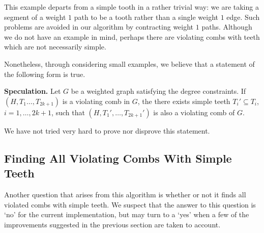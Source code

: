 \documentclass[11pt, letterpaper]{amsart}
\theoremstyle{plain}
\theoremstyle{definition}
\theoremstyle{remark}
\begin{document}
This example departs from a simple tooth in a rather trivial way: we are taking
a segment of a weight $1$ path to be a tooth rather than a single weight $1$
edge. Such problems are avoided in our algorithm by contracting weight $1$
paths. Although we do not have an example in mind, perhaps there are violating
combs with teeth which are not necessarily simple.

Nonetheless, through considering small examples, we believe that a statement of
the following form is true.

\noindent\textbf{Speculation.} Let $G$ be a weighted graph satisfying
the degree constraints. If $(H,T_1\ldots,T_{2k+1})$ is a violating comb in $G$,
the there exists simple teeth $T_i' \subseteq T_i$, $i = 1,\ldots,2k+1$, such
that $(H,T_1',\ldots,T_{2k+1}')$ is also a violating comb of $G$.

We have not tried very hard to prove nor disprove this statement.

\subsection{Finding All Violating Combs With Simple Teeth}
Another question that arises from this algorithm is whether or not it finds all
violated combs with simple teeth. We suspect that the answer to this question
is `no' for the current implementation, but may turn to a `yes' when a few of
the improvements suggested in the previous section are taken to account.
\end{document}

